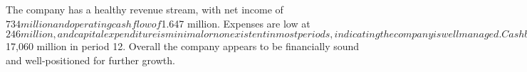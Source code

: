 

The company has a healthy revenue stream, with net income of $734 million and operating cash flow of $1.647 million. Expenses are low at $246 million, and capital expenditure is minimal or nonexistent in most periods, indicating the company is well managed. Cash balance remains positive throughout all periods, reaching a peak of $17,060 million in period 12. Overall the company appears to be financially sound and well-positioned for further growth.